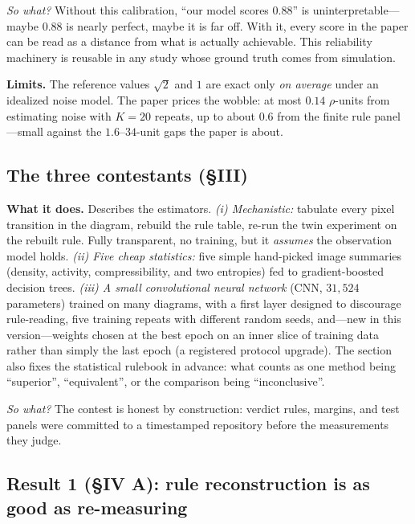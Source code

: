 \documentclass[11pt,a4paper]{article}
\newcommand{\sowhat}[1]{\emph{So what?} #1}
\begin{document}
\sowhat{Without this calibration, ``our model scores $0.88$'' is
uninterpretable---maybe $0.88$ is nearly perfect, maybe it is far off.
With it, every score in the paper can be read as a distance from what is
actually achievable. This reliability machinery is reusable in any study
whose ground truth comes from simulation.}

\textbf{Limits.} The reference values $\sqrt2$ and $1$ are exact only
\emph{on average} under an idealized noise model. The paper prices the
wobble: at most $0.14$ $\rho$-units from estimating noise with $K=20$
repeats, up to about $0.6$ from the finite rule panel---small against the
$1.6$--$34$-unit gaps the paper is about.

\subsection*{The three contestants (\S III)}

\textbf{What it does.} Describes the estimators. \emph{(i) Mechanistic:}
tabulate every pixel transition in the diagram, rebuild the rule table,
re-run the twin experiment on the rebuilt rule. Fully transparent, no
training, but it \emph{assumes} the observation model holds. \emph{(ii) Five
cheap statistics:} five simple hand-picked image summaries (density,
activity, compressibility, and two entropies) fed to gradient-boosted
decision trees. \emph{(iii) A small convolutional neural network} (CNN,
$31{,}524$ parameters) trained on many diagrams, with a first layer designed
to discourage rule-reading, five training repeats with different random
seeds, and---new in this version---weights chosen at the best epoch on an
inner slice of training data rather than simply the last epoch (a registered
protocol upgrade). The section also fixes the statistical rulebook in
advance: what counts as one method being ``superior'', ``equivalent'', or
the comparison being ``inconclusive''.

\sowhat{The contest is honest by construction: verdict rules, margins, and
test panels were committed to a timestamped repository before the
measurements they judge.}

\subsection*{Result 1 (\S IV A): rule reconstruction is as good as re-measuring}
\end{document}
